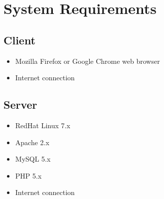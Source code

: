 \documentclass[11pt]{amsart}
\begin{document}
\section{System Requirements}
\subsection{Client}
\begin{itemize}
\item{Mozilla Firefox or Google Chrome web browser}
\item{Internet connection}
\end{itemize}

\subsection{Server}
\begin{itemize}
\item{RedHat Linux 7.x}
\item{Apache 2.x}
\item{MySQL 5.x}
\item{PHP 5.x}
\item{Internet connection}
\end{itemize}
\end{document}
